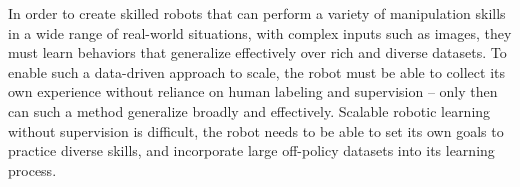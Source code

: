 In order to create skilled robots that can perform a variety of manipulation skills in a wide range of real-world situations, with complex inputs such as images, they must learn behaviors that generalize effectively over rich and diverse datasets. To enable such a data-driven approach to scale, the robot must be able to collect its own experience without reliance on human labeling and supervision -- only then can such a method generalize broadly and effectively.
Scalable robotic learning without supervision is difficult, the robot needs to be able to set its own goals to practice diverse skills, and incorporate large off-policy datasets into its learning process. 
